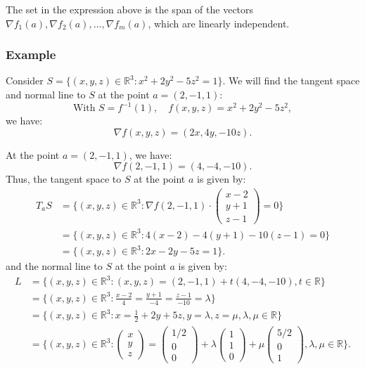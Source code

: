 \documentclass[11pt]{article}
\begin{document}
The set in the expression above is the span of the vectors \(\nabla f_1(a), \nabla f_2(a), \dots, \nabla f_m(a)\), which are linearly independent. 
\pagebreak
\subsubsection*{Example}
Consider \(S = \{(x,y,z) \in \mathbb{R}^3 : x^2 + 2y^2 - 5z^2 = 1\}\). We will find the tangent space and normal line to \(S\) at the point \(a = (2, -1, 1)\):
\[\text{With } S = f^{-1}(1), \quad f(x, y, z) = x^2 + 2y^2 - 5z^2,\]
we have:
\[\nabla f(x, y, z) = (2x, 4y, -10z).\]

At the point \(a = (2, -1, 1)\), we have:
\[\nabla f(2, -1, 1) = (4, -4, -10).\]
Thus, the tangent space to \(S\) at the point \(a\) is given by:
\begin{align*}
T_a S & = \{(x, y, z) \in \mathbb{R}^3 : \nabla f(2, -1, 1) \cdot \begin{pmatrix}
x - 2 \\ y + 1 \\ z - 1
\end{pmatrix} = 0\} \\
& = \{(x, y, z) \in \mathbb{R}^3 : 4(x - 2) - 4(y + 1) - 10(z - 1) = 0\} \\
& = \{(x, y, z) \in \mathbb{R}^3 : 2x - 2y - 5z = 1\}.
\end{align*}
and the normal line to \(S\) at the point \(a\) is given by:
\begin{align*}
L & = \{(x, y, z) \in \mathbb{R}^3 : (x, y, z) = (2, -1, 1) + t(4, -4, -10), t \in \mathbb{R}\} \\
& = \{(x, y, z) \in \mathbb{R}^3 : \frac{x - 2}{4} = \frac{y + 1}{-4} = \frac{z - 1}{-10} = \lambda\} \\
& = \{(x, y, z) \in \mathbb{R}^3 : x = \frac{1}{2} + 2y + 5z, y = \lambda, z = \mu, \lambda, \mu \in \mathbb{R}\} \\
& = \{(x, y, z) \in \mathbb{R}^3 : \begin{pmatrix}
x \\ y \\ z
\end{pmatrix} = \begin{pmatrix}
1/2 \\ 0 \\ 0
\end{pmatrix} + \lambda \begin{pmatrix}
1 \\ 1 \\ 0
\end{pmatrix} + \mu \begin{pmatrix}
5/2 \\ 0 \\ 1
\end{pmatrix}, \lambda, \mu \in \mathbb{R}\}.
\end{align*}
\end{document}
